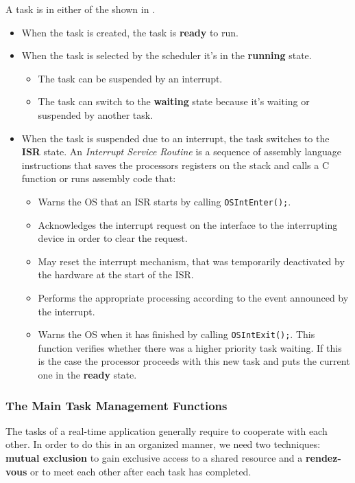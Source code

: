 A task is in either of the  shown in .
\begin{itemize}
	\item When the task is created, the task is \textbf{ready} to run.
	\item When the task is selected by the scheduler it's in the \textbf{running} state.
	\begin{itemize}
		\item The task can be suspended by an interrupt.
		\item The task can switch to the \textbf{waiting} state because it's waiting or suspended by another task.
	\end{itemize}
	\item When the task is suspended due to an interrupt, the task switches to the \textbf{ISR} state. An \textit{Interrupt Service Routine} is a sequence of assembly language instructions that saves the processors registers on the stack and calls a C function or runs assembly code that:
	\begin{itemize}
	\item Warns the OS that an ISR starts by calling \texttt{OSIntEnter();}.
	\item Acknowledges the interrupt request on the interface to the interrupting device in order to clear the request.
	\item May reset the interrupt mechanism, that was temporarily deactivated by the hardware at the start of the ISR.
	\item Performs the appropriate processing according to the event announced by the interrupt.
	\item Warns the OS when it has finished by calling \texttt{OSIntExit();}. This function verifies whether there was a  higher priority task waiting. If this is the case the processor proceeds with this new task and puts the current one in the \textbf{ready} state.
	\end{itemize}
\end{itemize}

\subsubsection{The Main Task Management Functions}
The tasks of a real-time application generally require to cooperate with each other.
In order to do this in an organized manner, we need two techniques:  \textbf{mutual exclusion} to gain exclusive access to a shared resource and a \textbf{rendez-vous} or  to meet each other after each task has completed.

